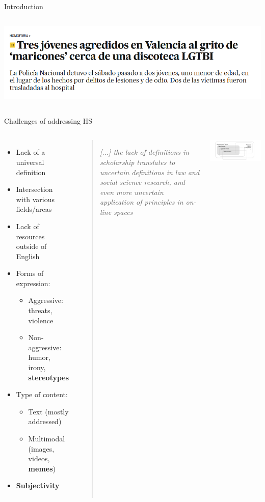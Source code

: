 \begin{frame}{Introduction}
\begin{columns}
                \vfill
                \includegraphics[width=\textwidth]{images/homofobia.PNG}
        \end{columns}
\end{frame}

\begin{frame}{Challenges of addressing HS}
    \begin{columns}
        \begin{itemize}
            \item Lack of a universal definition
        \item Intersection with various fields/areas
        \item Lack of resources outside of English
        \item Forms of expression:
            \begin{itemize}
        \item Aggressive: threats, violence
        \item Non-aggressive: humor, irony, \textbf{stereotypes}
            \end{itemize}
        \item Type of content:
            \begin{itemize}
            \item Text (mostly addressed)
            \item Multimodal (images, videos, \textbf{memes})
            \end{itemize}
        \item \textbf{Subjectivity}
        \end{itemize}
        \begin{quote}
            \textit{[...] the lack of definitions in scholarship translates to uncertain definitions
            in law and social science research, and even more uncertain application of
            principles in on-line spaces}
        \end{quote}
        \includegraphics[width=\textwidth]{images/marco-hate.png}
\end{columns}
\end{frame}

